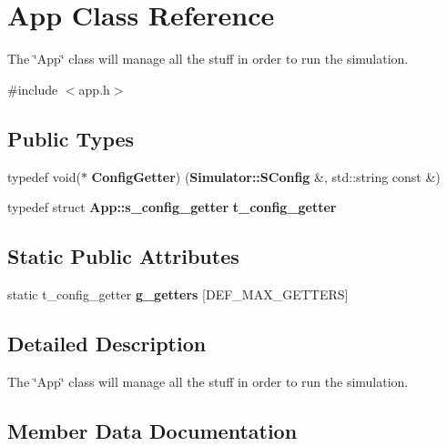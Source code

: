 \section{App Class Reference}
\label{class_app}


The \char`\"{}\+App\char`\"{} class will manage all the stuff in order to run the simulation.  




{\ttfamily \#include $<$app.\+h$>$}

\subsection*{Public Types}
\begin{DoxyCompactItemize}
\item 
typedef void($\ast$ {\bfseries Config\+Getter}) ({\bf Simulator\+::\+S\+Config} \&, std\+::string const \&)\label{class_app_ab4965ee935cdff07ac1daa677f45b5a9}

\item 
typedef struct {\bf App\+::s\+\_\+config\+\_\+getter} {\bfseries t\+\_\+config\+\_\+getter}\label{class_app_a33f1fc3e4e586c2c7d3afccfb32bb0a8}

\end{DoxyCompactItemize}
\subsection*{Static Public Attributes}
\begin{DoxyCompactItemize}
\item 
static t\+\_\+config\+\_\+getter {\bfseries g\+\_\+getters} [D\+E\+F\+\_\+\+M\+A\+X\+\_\+\+G\+E\+T\+T\+E\+R\+S]
\end{DoxyCompactItemize}


\subsection{Detailed Description}
The \char`\"{}\+App\char`\"{} class will manage all the stuff in order to run the simulation. 

\subsection{Member Data Documentation}

